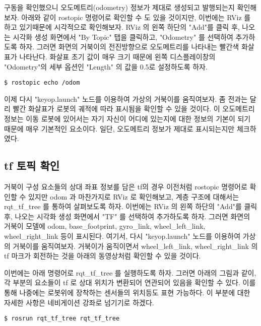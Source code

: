 구동을 확인했으니 오도메트리(odometry) 정보가 제대로 생성되고 발행되는지 확인해보자. 아래와 같이 rostopic 명령어로 확인할 수 도 있을 것이지만, 이번에는 RViz 를 하고 있기때문에 시각적으로 확인해보자. RViz 의 왼쪽 하단의 "Add"를 클릭 후, 나오는 시각화 생성 화면에서 "By Topic" 탭을 클릭하고, "Odometry" 를 선택하여 추가하도록 하자. 그러면 화면의 거북이의 전진방향으로 오도메트리를 나타내는 빨간색 화살표가 나타난다. 화살표 초기 값이 매우 크기 때문에 왼쪽 디스플레이창의 "Odometry"의 세부 옵션인 "Length" 의 값을 0.5로 설정하도록 하자.

\vspace{\baselineskip}
\begin{lstlisting}[language=ROS]
$ rostopic echo /odom
\end{lstlisting}

이제 다시 "keyop.launch" 노드를 이용하여 가상의 거북이를 움직여보자. 좀 전과는 달리 빨간 화살표가 로봇의 궤적에 따라 표시됨을 확인할 수 있을 것이다. 이 오도메트리 정보는 이동 로봇에 있어서는 자기 자신이 어디에 있는지에 대한 정보의 기본이 되기 때문에 매우 기본적인 요소이다. 일단, 오도메트리 정보가 제대로 표시되는지만 체크하였다.

\subsection{tf 토픽 확인}

거북이 구성 요소들의 상대 좌표 정보를 담은 tf의 경우 이전처럼 rostopic 명령어로 확인할 수 있지만 odom 과 마찬가지로 RViz 로 확인해보고, 계층 구조에 대해서는 rqt\_tf\_tree 를 통하여 살펴보도록 하자. 이번에는 RViz 의 왼쪽 하단의 "Add"를 클릭 후, 나오는 시각화 생성 화면에서 "TF" 를 선택하여 추가하도록 하자. 그러면 화면의 거북이 모델에 odom, base\_footprint, gyro\_link, wheel\_left\_link, wheel\_right\_link 등이 표시된다. 여기서, 다시 "keyop.launch" 노드를 이용하여 가상의 거북이를 움직여보자. 거북이가 움직이면서 wheel\_left\_link, wheel\_right\_link 의 tf 마크가 회전하는 것을 아래의 동영상처럼 확인할 수 있을 것이다.

이번에는 아래 명령어로 rqt\_tf\_tree 를 실행하도록 하자. 그러면 아래의 그림과 같이, 각 부분의 요소들이 tf 로 상대 위치가 변환되어 연관되어 있음을 확인할 수 있다. 이를 통해 나중에는 로봇위에 장착하는 센서들의 위치등도 표현 가능하다. 이 부분에 대한 자세한 사항은 네비게이션 강좌로 넘기기로 하겠다.

\vspace{\baselineskip}
\begin{lstlisting}[language=ROS]
$ rosrun rqt_tf_tree rqt_tf_tree 
\end{lstlisting}

